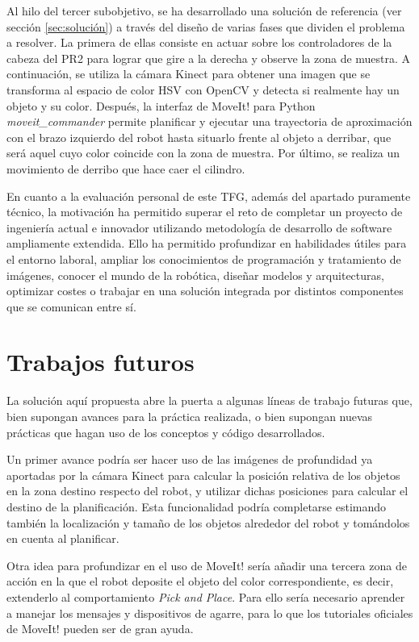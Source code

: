 \documentclass[12pt,spanish,chapterprefix, numbers=noenddot]{book}
\numberwithin{equation}{section}
\numberwithin{figure}{section}
\begin{document}
Al hilo del tercer subobjetivo, se ha desarrollado una solución de referencia (ver sección \ref{sec:solución}) a través del diseño de varias fases que dividen el problema a resolver. La primera de ellas consiste en actuar sobre los controladores de la cabeza del PR2 para lograr que gire a la derecha y observe la zona de muestra. A continuación, se utiliza la cámara Kinect para obtener una imagen que se transforma al espacio de color HSV con OpenCV y detecta si realmente hay un objeto y su color. Después, la interfaz de MoveIt! para Python \textit{moveit\_commander}  permite planificar y ejecutar una trayectoria de aproximación con el brazo izquierdo del robot hasta situarlo frente al objeto a derribar, que será aquel cuyo color coincide con la zona de muestra. Por último, se realiza un movimiento de derribo que hace caer el cilindro.

En cuanto a la evaluación personal de este TFG, además del apartado puramente técnico, la motivación ha permitido superar el reto de completar un proyecto de ingeniería actual e innovador utilizando metodología de desarrollo de software ampliamente extendida. Ello ha permitido profundizar en habilidades útiles para el entorno laboral, ampliar los conocimientos de programación y tratamiento de imágenes, conocer el mundo de la robótica, diseñar modelos y arquitecturas, optimizar costes o trabajar en una solución integrada por distintos componentes que se comunican entre sí.  

\section{Trabajos futuros}

La solución aquí propuesta abre la puerta a algunas líneas de trabajo futuras que, bien supongan avances para la práctica realizada, o bien supongan nuevas prácticas que hagan uso de los conceptos y código desarrollados. 

Un primer avance podría ser hacer uso de las imágenes de profundidad ya aportadas por la cámara Kinect para calcular la posición relativa de los objetos en la zona destino respecto del robot, y utilizar dichas posiciones para calcular el destino de la planificación. Esta funcionalidad podría completarse estimando también la localización y tamaño de los objetos alrededor del robot y tomándolos en cuenta al planificar. 

Otra idea para profundizar en el uso de MoveIt! sería añadir una tercera zona de acción en la que el robot deposite el objeto del color correspondiente, es decir, extenderlo al comportamiento \textit{Pick and Place}. Para ello sería necesario aprender a manejar los mensajes y dispositivos de agarre, para lo que los tutoriales oficiales de MoveIt! pueden ser de gran ayuda.
\end{document}
